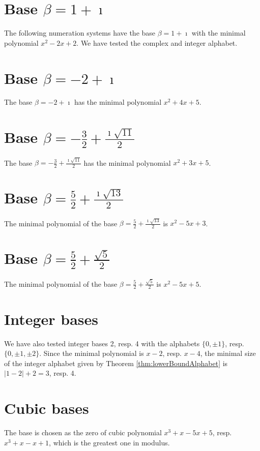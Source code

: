 \section{\texorpdfstring{Base $\beta = 1 + \imath$}{Base beta = 1 + i}}
The following numeration systems have the base $\beta =1 + \imath$ with the minimal polynomial $x^2-2x+2$. We have tested the complex and integer alphabet. 



 

\section{\texorpdfstring{Base $\beta = -2 + \imath$}{Base beta = -2 + i}}
The base  $\beta = -2 + \imath$ has the minimal polynomial $x^2+4x +5$.

% 
\section{\texorpdfstring{Base $\beta = -\frac{3}{2} + \frac{\imath \sqrt{11}}{2}$}{Base beta = -{3}/{2} + i sqrt(11)/{2}}}
The base $\beta = -\frac{3}{2} + \frac{\imath \sqrt{11}}{2}$ has the minimal polynomial  $x^2+3x +5$.


\section{\texorpdfstring{Base $\beta = \frac{5}{2} + \frac{\imath \sqrt{13}}{2}$}{Base beta = {5}/{2} + i sqrt(13)/2}}
The minimal polynomial of the base $\beta = \frac{5}{2} + \frac{\imath \sqrt{13}}{2}$ is $x^2 -5x+3$.


\section{\texorpdfstring{Base $\beta = \frac{5}{2} + \frac{\sqrt{5}}{2}$}{Base beta = {5}/{2} + sqrt(5)/{2}}}
The minimal polynomial of the base $\beta = \frac{5}{2} + \frac{\sqrt{5}}{2}$ is $x^2 -5x+5$.


\section{Integer bases}
We have also tested integer bases 2, resp. 4 with the alphabets $\{0,\pm 1\}$, resp. $\{0,\pm 1, \pm 2\}$. Since the minimal polynomial is $x-2$, resp. $x-4$, the minimal size of the integer alphabet given by Theorem \ref{thm:lowerBoundAlphabet} is $|1-2|+2=3$, resp. 4. 



\section{Cubic bases}
The base is chosen as the zero of cubic polynomial $x^3+x-5x+5$, resp. $x^3+x-x+1$, which is the greatest one in modulus. 

